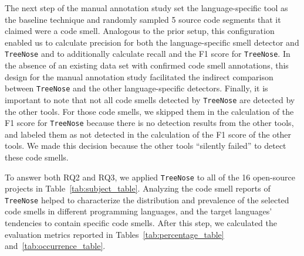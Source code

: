 The next step of the manual annotation study set the language-specific tool as
the baseline technique and randomly sampled 5 source code segments that it
claimed were a code smell.
%
Analogous to the prior setup, this configuration enabled us to calculate
precision for both the language-specific smell detector and \texttt{TreeNose}
and to additionally calculate recall and the F1 score for \texttt{TreeNose}.
%
In the absence of an existing data set with confirmed code smell annotations,
this design for the manual annotation study facilitated the indirect comparison
between \texttt{TreeNose} and the other language-specific detectors.
%
Finally, it is important to note that not all code smells detected by
\texttt{TreeNose} are detected by the other tools. For those code smells, we
skipped them in the calculation of the F1 score for \texttt{TreeNose} because
there is no detection results from the other tools, and labeled them as not
detected in the calculation of the F1 score of the other tools. We made this
decision because the other tools ``silently failed'' to detect these code
smells.






%
To answer both RQ2 and RQ3, we applied \texttt{TreeNose} to all of the 16
open-source projects in Table~\ref{tab:subject_table}.
%
%
%
%
Analyzing the code smell reports of \texttt{TreeNose} helped to characterize the
distribution and prevalence of the selected code smells in different programming
languages, and the target languages' tendencies to contain specific code smells.
%
After this step, we calculated the evaluation metrics reported in
Tables~\ref{tab:percentage_table} and~\ref{tab:occurrence_table}.

